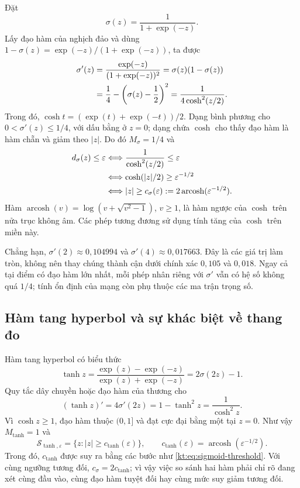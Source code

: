 Đặt
\begin{equation}
 \sigma(z)=\frac{1}{1+\exp(-z)}.
 \label{kt:eq:sigmoid}
\end{equation}
Lấy đạo hàm của nghịch đảo và dùng
$1-\sigma(z)=\exp(-z)/(1+\exp(-z))$, ta được
\begin{align}
 \sigma'(z)
 &=\frac{\exp(-z)}{(1+\exp(-z))^2}
   =\sigma(z)(1-\sigma(z))\notag\\
 &=\frac14-\left(\sigma(z)-\frac12\right)^2
   =\frac{1}{4\cosh^2(z/2)}.
 \label{kt:eq:sigmoid-prime}
\end{align}
Trong đó, $\cosh t=(\exp(t)+\exp(-t))/2$. Dạng bình phương cho
$0<\sigma'(z)\leq1/4$, với dấu bằng ở $z=0$; dạng chứa $\cosh$
cho thấy đạo hàm là hàm chẵn và giảm theo $|z|$. Do đó
$M_\sigma=1/4$ và
\begin{align}
 d_\sigma(z)\leq\varepsilon
 &\Longleftrightarrow\frac{1}{\cosh^2(z/2)}\leq\varepsilon\notag\\
 &\Longleftrightarrow\cosh(|z|/2)\geq\varepsilon^{-1/2}\notag\\
 &\Longleftrightarrow |z|\geq
 c_\sigma(\varepsilon):=2\operatorname{arcosh}(\varepsilon^{-1/2}).
 \label{kt:eq:sigmoid-threshold}
\end{align}
Hàm $\operatorname{arcosh}(v)=\log(v+\sqrt{v^2-1})$, $v\geq1$,
là hàm ngược của $\cosh$ trên nửa trục không âm. Các phép tương
đương sử dụng tính tăng của $\cosh$ trên miền này.

Chẳng hạn, $\sigma'(2)\approx0{,}104994$ và
$\sigma'(4)\approx0{,}017663$. Đây là các giá trị làm tròn,
không nên thay chúng thành cận dưới chính xác $0{,}105$ và
$0{,}018$. Ngay cả tại điểm có đạo hàm lớn nhất, mỗi phép nhân
riêng với $\sigma'$ vẫn có hệ số không quá $1/4$; tính ổn định của
mạng còn phụ thuộc các ma trận trọng số.

\subsection{Hàm tang hyperbol và sự khác biệt về thang đo}

Hàm tang hyperbol có biểu thức
\begin{equation}
 \tanh z=\frac{\exp(z)-\exp(-z)}{\exp(z)+\exp(-z)}
        =2\sigma(2z)-1.
 \label{kt:eq:tanh}
\end{equation}
Quy tắc dây chuyền hoặc đạo hàm của thương cho
\begin{equation}
 (\tanh z)'=4\sigma'(2z)=1-\tanh^2z
           =\frac1{\cosh^2z}.
 \label{kt:eq:tanh-prime}
\end{equation}
Vì $\cosh z\geq1$, đạo hàm thuộc $(0,1]$ và đạt cực đại bằng một
tại $z=0$. Như vậy $M_{\tanh}=1$ và
\begin{equation}
 \mathcal S_{\tanh,\varepsilon}
 =\{z:|z|\geq c_{\tanh}(\varepsilon)\},\qquad
 c_{\tanh}(\varepsilon)=\operatorname{arcosh}(\varepsilon^{-1/2}).
 \label{kt:eq:tanh-threshold}
\end{equation}
Trong đó, $c_{\tanh}$ được suy ra bằng các bước như
\eqref{kt:eq:sigmoid-threshold}. Với cùng ngưỡng tương đối,
$c_\sigma=2c_{\tanh}$; vì vậy việc so sánh hai hàm phải chỉ rõ
đang xét cùng đầu vào, cùng đạo hàm tuyệt đối hay cùng mức suy giảm
tương đối.

